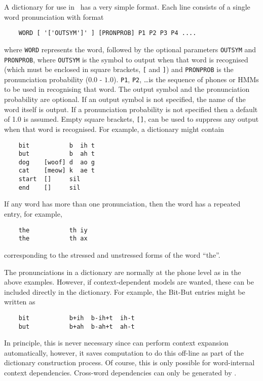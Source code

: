A dictionary for use in \HTK\ has a very simple format.
Each line consists of a single word pronunciation with format
\begin{verbatim}
    WORD [ '['OUTSYM']' ] [PRONPROB] P1 P2 P3 P4 ....
\end{verbatim}
where \texttt{WORD} represents the word, followed by the optional
parameters \texttt{OUTSYM} and \texttt{PRONPROB}, where
\texttt{OUTSYM} is the symbol to output when that word is
recognised (which must be enclosed in square brackets, \verb|[| and
\verb|]|) and \texttt{PRONPROB} is the pronunciation probability
($0.0$ - $1.0$).  \texttt{P1}, \texttt{P2}, \ldots is the sequence of
phones or HMMs to be used in recognising that word. The output symbol
and the pronunciation probability are optional. If an output symbol is
not specified, the name of the word itself is output. If a
pronunciation probability is not specified then a default of 1.0 is
assumed.  Empty square brackets,
\texttt{[]}, can be used to suppress any output when that word is recognised.
For example, a dictionary might contain
\begin{verbatim}
    bit           b  ih t 
    but           b  ah t
    dog    [woof] d  ao g
    cat    [meow] k  ae t
    start  []     sil
    end    []     sil
\end{verbatim}

\noindent
If any word has more than one pronunciation, then the word
has a repeated entry, for example,
\begin{verbatim}
    the           th iy
    the           th ax 
\end{verbatim}
corresponding to the stressed and unstressed forms of the word
``the''.

The pronunciations in a dictionary are normally at the phone
level as in the above examples.  However, if context-dependent
models are wanted, these can be included directly in the dictionary.
For example, the Bit-But entries might be written as
\begin{verbatim}
    bit           b+ih  b-ih+t  ih-t 
    but           b+ah  b-ah+t  ah-t
\end{verbatim}
In principle, this is never necessary since  can perform context
expansion automatically, however, it saves computation to do this
off-line as part of the dictionary construction process.  Of course,
this is only possible for word-internal context dependencies.
Cross-word dependencies can only be generated by .

